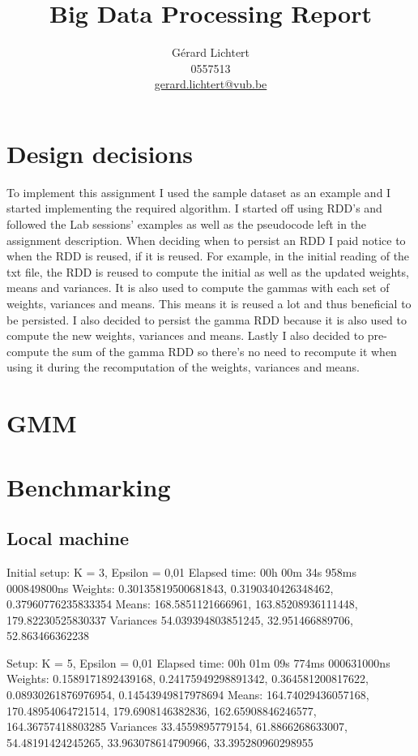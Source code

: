 \documentclass{article}
\title{Big Data Processing Report}
\author{Gérard Lichtert\\
0557513\\
\href{mailto:gerard.lichtert@vub.be}{gerard.lichtert@vub.be}
}
\begin{document}
\maketitle

\tableofcontents
\newpage
\section{Design decisions}
\label{sec:design-decisions}
To implement this assignment I used the sample dataset as an example and I started implementing the required algorithm. I started off using RDD's and followed the Lab sessions' examples as well as the pseudocode left in the assignment description. When deciding when to persist an RDD I paid notice to when the RDD is reused, if it is reused. For example, in the initial reading of the txt file, the RDD is reused to compute the initial as well as the updated weights, means and variances. It is also used to compute the gammas with each set of weights, variances and means. This means it is reused a lot and thus beneficial to be persisted. I also decided to persist the gamma RDD because it is also used to compute the new weights, variances and means. Lastly I also decided to pre-compute the sum of the gamma RDD so there's no need to recompute it when using it during the recomputation of the weights, variances and means.
\section{GMM}


\section{Benchmarking}
\subsection{Local machine}
Initial setup: K = 3, Epsilon = 0,01
Elapsed time: 00h 00m 34s 958ms 000849800ns
Weights: 0.30135819500681843, 0.3190340426348462, 0.37960776235833354
Means:  168.5851121666961, 163.85208936111448, 179.82230525830337
Variances 54.039394803851245, 32.951466889706, 52.863466362238

Setup: K = 5, Epsilon = 0,01
Elapsed time: 00h 01m 09s 774ms 000631000ns
Weights: 0.1589171892439168, 0.24175949298891342, 0.364581200817622, 0.08930261876976954, 0.14543949817978694
Means:  164.74029436057168, 170.48954064721514, 179.6908146382836, 162.65908846246577, 164.36757418803285
Variances 33.4559895779154, 61.8866268633007, 54.48191424245265, 33.963078614790966, 33.395280960298955
\end{document}
